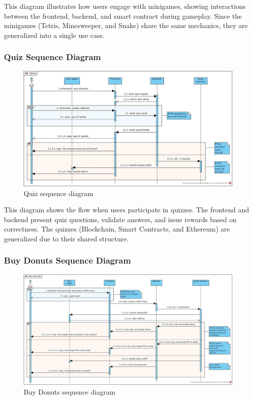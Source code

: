 \documentclass[../main.tex]{subfiles}
\begin{document}
This diagram illustrates how users engage with minigames, showing interactions between the frontend, backend, and smart contract during gameplay. Since the minigames (Tetris, Minesweeper, and Snake) share the same mechanics, they are generalized into a single use case.


\subsubsection{Quiz Sequence Diagram}

\begin{figure}[H]
    \centering
    \includegraphics[width=\linewidth]{../src/diagrams/Quiz.jpg}
    \caption{Quiz sequence diagram}
    \label{fig:Quiz_seqDiag}
\end{figure}

This diagram shows the flow when users participate in quizzes. The frontend and backend present quiz questions, validate answers, and issue rewards based on correctness. The quizzes (Blockchain, Smart Contracts, and Ethereum) are generalized due to their shared structure.


\subsubsection{Buy Donuts Sequence Diagram}

\begin{figure}[H]
    \centering
    \includegraphics[width=\linewidth]{../src/diagrams/Buy Donuts.jpg}
    \caption{Buy Donuts sequence diagram}
    \label{fig:buyDNT_seqDiag}
\end{figure}
\end{document}

